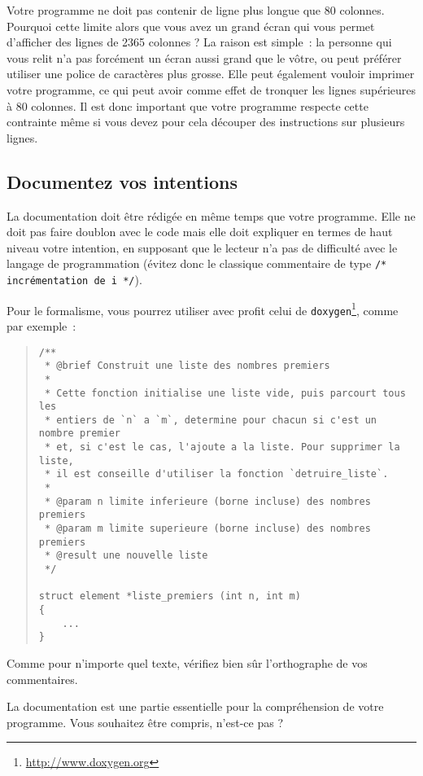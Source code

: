 \documentclass {article}
\begin{document}
Votre programme ne doit pas contenir de ligne plus longue que 80 colonnes.
Pourquoi cette limite alors que vous avez un grand écran qui vous permet
d'afficher des lignes de 2365 colonnes ? La raison est simple~:
la personne qui vous relit n'a pas forcément un écran aussi grand que le
vôtre, ou peut préférer utiliser une police de caractères plus grosse.
Elle peut également vouloir imprimer votre programme, ce qui peut avoir
comme effet de tronquer les lignes supérieures à 80 colonnes.  Il est
donc important que votre programme respecte cette contrainte même si
vous devez pour cela découper des instructions sur plusieurs lignes.


\subsection {Documentez vos intentions}

La documentation doit être rédigée en même temps que votre programme.
Elle ne doit pas faire doublon avec le code mais elle doit expliquer
en termes de haut niveau votre intention, en supposant que le lecteur
n'a pas de difficulté avec le langage de programmation (évitez donc
le classique commentaire de type \verb|/* incrémentation de i */|).

Pour le formalisme, vous pourrez utiliser avec profit celui de \texttt
{doxygen}\footnote {\url {http://www.doxygen.org}}, comme par exemple~:

\begin {quote}
\begin {lstlisting}
/**
 * @brief Construit une liste des nombres premiers
 *
 * Cette fonction initialise une liste vide, puis parcourt tous les
 * entiers de `n` a `m`, determine pour chacun si c'est un nombre premier
 * et, si c'est le cas, l'ajoute a la liste. Pour supprimer la liste,
 * il est conseille d'utiliser la fonction `detruire_liste`.
 *
 * @param n limite inferieure (borne incluse) des nombres premiers
 * @param m limite superieure (borne incluse) des nombres premiers
 * @result une nouvelle liste
 */

struct element *liste_premiers (int n, int m)
{
    ...
}
\end{lstlisting}
\end {quote}

Comme pour n'importe quel texte, vérifiez bien sûr l'orthographe de
vos commentaires.

La documentation est une partie essentielle pour la compréhension de
votre programme. Vous souhaitez être compris, n'est-ce pas ?
\end{document}
